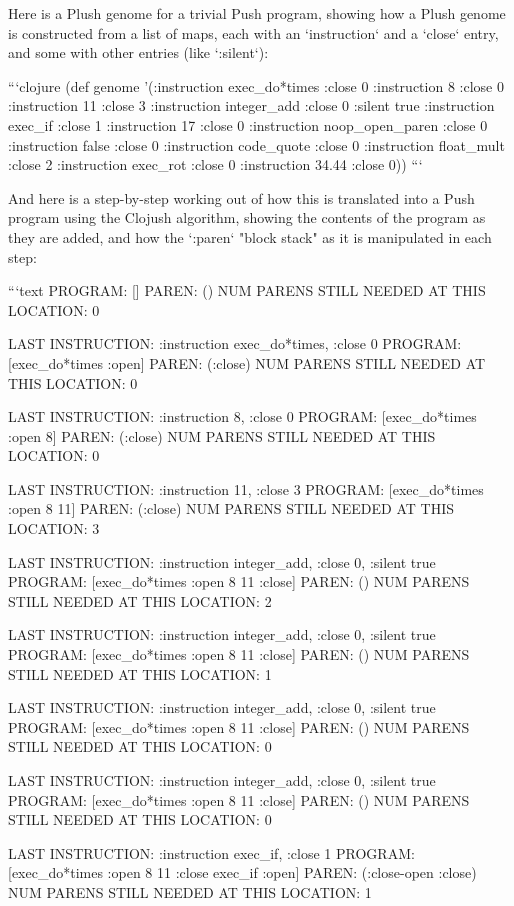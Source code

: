Here is a Plush genome for a trivial Push program, showing how a Plush genome is constructed from a list of maps, each with an `instruction` and a `close` entry, and some with other entries (like `:silent`):

```clojure
(def genome
  '({:instruction exec\_do*times :close 0}
     {:instruction 8 :close 0}
     {:instruction 11 :close 3}
     {:instruction integer\_add :close 0 :silent true}
     {:instruction exec\_if :close 1}
     {:instruction 17 :close 0}
     {:instruction noop\_open\_paren :close 0}
     {:instruction false :close 0}
     {:instruction code\_quote :close 0}
     {:instruction float\_mult :close 2}
     {:instruction exec\_rot :close 0}
     {:instruction 34.44 :close 0}))
```

And here is a step-by-step working out of how this is translated into a Push program using the Clojush algorithm, showing the contents of the program as they are added, and how the `:paren` "block stack" as it is manipulated in each step:

```text
PROGRAM: []
PAREN: ()
NUM PARENS STILL NEEDED AT THIS LOCATION: 0

LAST INSTRUCTION: {:instruction exec\_do*times, :close 0}
PROGRAM: [exec\_do*times :open]
PAREN: (:close)
NUM PARENS STILL NEEDED AT THIS LOCATION: 0

LAST INSTRUCTION: {:instruction 8, :close 0}
PROGRAM: [exec\_do*times :open 8]
PAREN: (:close)
NUM PARENS STILL NEEDED AT THIS LOCATION: 0

LAST INSTRUCTION: {:instruction 11, :close 3}
PROGRAM: [exec\_do*times :open 8 11]
PAREN: (:close)
NUM PARENS STILL NEEDED AT THIS LOCATION: 3

LAST INSTRUCTION: {:instruction integer\_add, :close 0, :silent true}
PROGRAM: [exec\_do*times :open 8 11 :close]
PAREN: ()
NUM PARENS STILL NEEDED AT THIS LOCATION: 2

LAST INSTRUCTION: {:instruction integer\_add, :close 0, :silent true}
PROGRAM: [exec\_do*times :open 8 11 :close]
PAREN: ()
NUM PARENS STILL NEEDED AT THIS LOCATION: 1

LAST INSTRUCTION: {:instruction integer\_add, :close 0, :silent true}
PROGRAM: [exec\_do*times :open 8 11 :close]
PAREN: ()
NUM PARENS STILL NEEDED AT THIS LOCATION: 0

LAST INSTRUCTION: {:instruction integer\_add, :close 0, :silent true}
PROGRAM: [exec\_do*times :open 8 11 :close]
PAREN: ()
NUM PARENS STILL NEEDED AT THIS LOCATION: 0

LAST INSTRUCTION: {:instruction exec\_if, :close 1}
PROGRAM: [exec\_do*times :open 8 11 :close exec\_if :open]
PAREN: (:close-open :close)
NUM PARENS STILL NEEDED AT THIS LOCATION: 1

